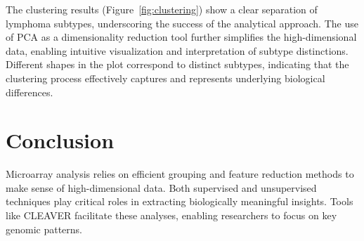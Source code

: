\documentclass{llncs}
\begin{document}
The clustering results (Figure~\ref{fig:clustering}) show a clear separation of lymphoma subtypes, underscoring the success of the analytical approach. The use of PCA as a dimensionality reduction tool further simplifies the high-dimensional data, enabling intuitive visualization and interpretation of subtype distinctions. Different shapes in the plot correspond to distinct subtypes, indicating that the clustering process effectively captures and represents underlying biological differences.

\section{Conclusion}
Microarray analysis relies on efficient grouping and feature reduction methods to make sense of high-dimensional data. Both supervised and unsupervised techniques play critical roles in extracting biologically meaningful insights. Tools like CLEAVER facilitate these analyses, enabling researchers to focus on key genomic patterns.
\end{document}
